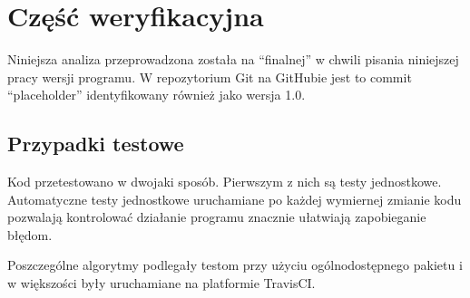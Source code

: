\section[Weryfikacja]{Część weryfikacyjna} %
    Niniejsza analiza przeprowadzona została na ``finalnej'' w chwili pisania
    niniejszej pracy wersji programu.  W repozytorium Git na GitHubie jest to
    commit ``placeholder''  identyfikowany
    również jako wersja 1.0.

    \subsection{Przypadki testowe}

    Kod przetestowano w dwojaki sposób. Pierwszym z nich są testy jednostkowe.
    Automatyczne testy jednostkowe uruchamiane po każdej wymiernej zmianie kodu
    pozwalają kontrolować działanie programu znacznie ułatwiają zapobieganie
    błędom.

    Poszczególne algorytmy podlegały testom przy użyciu ogólnodostępnego
    pakietu  i w większości były
    uruchamiane na platformie TravisCI.

